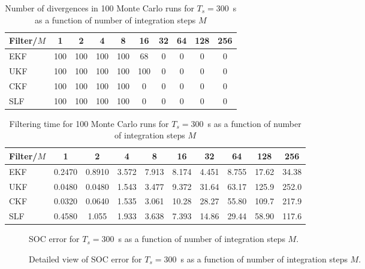 \documentclass[../zhang_thesis.tex]{subfiles}
\begin{document}
\clearpage

\begin{table}[h]
\centering
\caption{Number of divergences in 100 Monte Carlo runs for $T_s=300$~s as a function of number of integration steps $M$}
\begin{tabular}{@{}l*{9}{c}@{}}
\toprule
Filter/$M$ & 1   & 2   & 4   & 8   & 16  & 32 & 64 & 128 & 256 \\
\midrule
EKF        & 100 & 100 & 100 & 100 & 68  & 0  & 0  & 0   & 0   \\
UKF        & 100 & 100 & 100 & 100 & 100 & 0  & 0  & 0   & 0   \\
CKF        & 100 & 100 & 100 & 100 & 0   & 0  & 0  & 0   & 0   \\
SLF        & 100 & 100 & 100 & 100 & 0   & 0  & 0  & 0   & 0   \\
\bottomrule
\end{tabular}
\label{tab:div_300}
\end{table}

\begin{table}[h]
\centering
\caption{Filtering time for 100 Monte Carlo runs for $T_s=300$~s as a function of number of integration steps $M$}
\begin{tabular}{@{}lccccccccc@{}}
\toprule
Filter/$M$ & 1      & 2      & 4     & 8     & 16    & 32    & 64    & 128   & 256   \\ \midrule
EKF        & 0.2470 & 0.8910 & 3.572 & 7.913 & 8.174 & 4.451 & 8.755 & 17.62 & 34.38 \\
UKF        & 0.0480 & 0.0480 & 1.543 & 3.477 & 9.372 & 31.64 & 63.17 & 125.9 & 252.0 \\
CKF        & 0.0320 & 0.0640 & 1.535 & 3.061 & 10.28 & 28.27 & 55.80 & 109.7 & 217.9 \\
SLF        & 0.4580 & 1.055  & 1.933 & 3.638 & 7.393 & 14.86 & 29.44 & 58.90 & 117.6 \\ \bottomrule
\end{tabular}
\label{tab:time_300}
\end{table}

\clearpage

\begin{figure}[p]
\centering

\caption{SOC error for $T_s=300$~s as a function of number of integration steps $M$.}
\label{fig:mrmse_300}
\end{figure}

\begin{figure}[p]
\centering

\caption{Detailed view of SOC error for $T_s=300$~s as a function of number of integration steps $M$.}
\label{fig:mrmse_det_300}
\end{figure}
\end{document}

